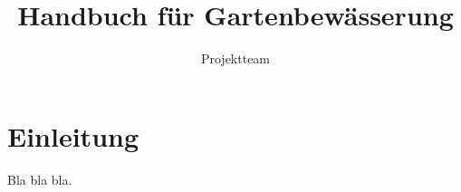 \documentclass[10pt,a4paper,twoside,titlepage]{book}
\author{Projektteam}
\title{Handbuch für Gartenbewässerung}
\begin{document}
\maketitle

\tableofcontents

\chapter{Einleitung}
Bla bla bla.
\end{document}
